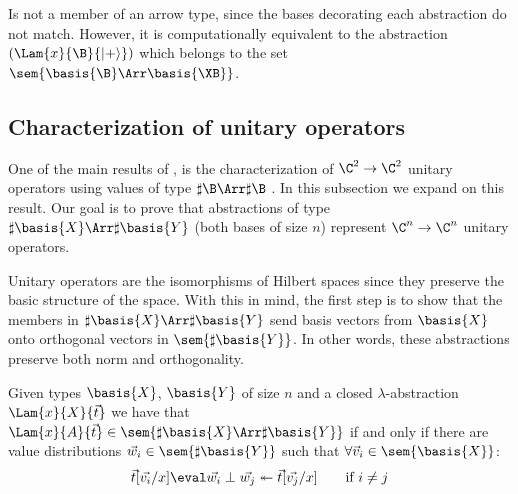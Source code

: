 Is not a member of an arrow type, since the bases decorating each abstraction do not match. However, it is computationally equivalent to the abstraction $(\Lam{x}{\B}{\ket{+}})$ which belongs to the set $\sem{\basis{\B}\Arr\basis{\XB}}$.

\subsection{Characterization of unitary operators}

One of the main results of \cite{DiazcaroGuillermoMiquelValironLICS19}, is the characterization of $\C^2\to\C^2$ unitary operators using values of type $\sharp\B\Arr\sharp\B$ \cite[Theorem IV.12]{DiazcaroGuillermoMiquelValironLICS19}. In this subsection we expand on this result. Our goal is to prove that abstractions of type $\sharp\basis{X}\Arr\sharp\basis{Y}$ (both bases of size $n$) represent $\C^n\to\C^n$ unitary operators.

Unitary operators are the isomorphisms of Hilbert spaces since they preserve the basic structure of the space. With this in mind, the first step is to show that the members in $\sharp\basis{X}\Arr\sharp{\basis{Y}}$ send basis vectors from $\basis{X}$ onto orthogonal vectors in $\sem{\sharp\basis{Y}}$. In other words, these abstractions preserve both norm and orthogonality.

\begin{lemma}\label{lem:BasesIso}
  Given types $\basis{X}$, $\basis{Y}$ of size $n$ and a closed $\lambda$-abstraction $\Lam{x}{X}{\vec t}$ we have that $\Lam{x}{A}{\vec t}\in\sem{\sharp\basis{X}\Arr\sharp\basis{Y}}$ if and only if there are value distributions $\vec w_i\in\sem{\sharp\basis{Y}}$ such that $\forall\vec v_i\in\sem{\basis{X}}$:
  \[
    \vec{t}[\vec{v_i}/x]\eval\vec{w_i}\perp\vec{w_j}\twoheadleftarrow \vec{t}[\vec{v_j}/x] \qquad \text{if } i\neq j
  \]
\end{lemma}

